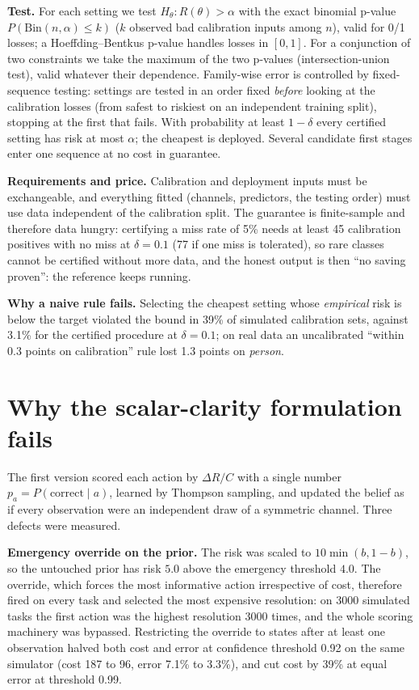\documentclass[11pt]{article}
\begin{document}
\textbf{Test.} For each setting we test $H_\theta: R(\theta)>\alpha$ with the exact binomial p-value
$P(\mathrm{Bin}(n,\alpha)\le k)$ ($k$ observed bad calibration inputs among $n$), valid for 0/1 losses; a
Hoeffding--Bentkus p-value handles losses in $[0,1]$. For a conjunction of two constraints we take the
maximum of the two p-values (intersection-union test), valid whatever their dependence. Family-wise error is
controlled by fixed-sequence testing: settings are tested in an order fixed \emph{before} looking at the
calibration losses (from safest to riskiest on an independent training split), stopping at the first that fails.
With probability at least $1-\delta$ every certified setting has risk at most $\alpha$; the cheapest is deployed.
Several candidate first stages enter one sequence at no cost in guarantee.

\textbf{Requirements and price.} Calibration and deployment inputs must be exchangeable, and everything fitted
(channels, predictors, the testing order) must use data independent of the calibration split. The guarantee is
finite-sample and therefore data hungry: certifying a miss rate of 5\% needs at least 45 calibration positives
with no miss at $\delta{=}0.1$ (77 if one miss is tolerated), so rare classes cannot be certified without more data,
and the honest output is then ``no saving proven'': the reference keeps running.

\textbf{Why a naive rule fails.} Selecting the cheapest setting whose \emph{empirical} risk is below the target
violated the bound in 39\% of simulated calibration sets, against 3.1\% for the certified procedure at
$\delta{=}0.1$; on real data an uncalibrated ``within 0.3 points on calibration'' rule lost 1.3 points on \emph{person}.

\section{Why the scalar-clarity formulation fails}
\label{sec:failure}

The first version scored each action by $\Delta R/C$ with a single number $p_a=P(\text{correct}\mid a)$,
learned by Thompson sampling, and updated the belief as if every observation were an independent draw
of a symmetric channel. Three defects were measured.

\textbf{Emergency override on the prior.} The risk was scaled to $10\min(b,1{-}b)$, so the untouched
prior has risk $5.0$ above the emergency threshold $4.0$. The override, which forces the most
informative action irrespective of cost, therefore fired on every task and selected the most expensive
resolution: on 3000 simulated tasks the first action was the highest resolution 3000 times, and the
whole scoring machinery was bypassed. Restricting the override to states after at least one observation
halved both cost and error at confidence threshold 0.92 on the same simulator (cost 187 to 96, error 7.1\% to 3.3\%),
and cut cost by 39\% at equal error at threshold 0.99.
\end{document}
